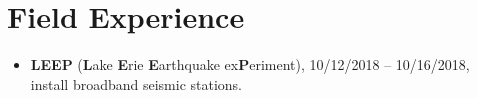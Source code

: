 \section*{Field Experience}
\begin{itemize}
\item \textbf{LEEP} (\textbf{L}ake \textbf{E}rie \textbf{E}arthquake ex\textbf{P}eriment), 
      10/12/2018 -- 10/16/2018, install broadband seismic stations.
\end{itemize}
